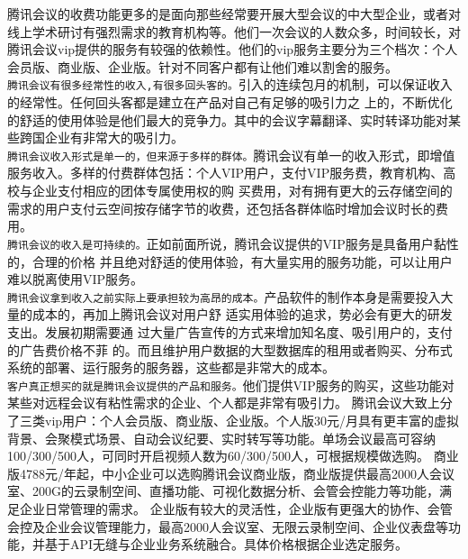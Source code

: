 \documentclass[a4paper,12pt]{article}
\begin{document}
腾讯会议的收费功能更多的是面向那些经常要开展大型会议的中大型企业，或者对
线上学术研讨有强烈需求的教育机构等。他们一次会议的人数众多，时间较长，对腾讯会议vip提供的服务有较强的依赖性。他们的vip服务主要分为三个档次：个人会员版、商业版、企业版。针对不同客户都有让他们难以割舍的服务。\\

\texttt{腾讯会议有很多经常性的收入,有很多回头客的。}引入的连续包月的机制，可以保证收入的经常性。任何回头客都是建立在产品对自己有足够的吸引力之
上的，不断优化的舒适的使用体验是他们最大的竞争力。其中的会议字幕翻译、实时转译功能对某些跨国企业有非常大的吸引力。\\

\texttt{腾讯会议收入形式是单一的，但来源于多样的群体。}腾讯会议有单一的收入形式，即增值服务收入。多样的付费群体包括：个人VIP用户，支付VIP服务费，教育机构、高校与企业支付相应的团体专属使用权的购
买费用，对有拥有更大的云存储空间的需求的用户支付云空间按存储字节的收费，还包括各群体临时增加会议时长的费用。\\

\texttt{腾讯会议的收入是可持续的。}正如前面所说，腾讯会议提供的VIP服务是具备用户黏性的，合理的价格
并且绝对舒适的使用体验，有大量实用的服务功能，可以让用户难以脱离使用VIP服务。\\

\texttt{腾讯会议拿到收入之前实际上要承担较为高昂的成本。}产品软件的制作本身是需要投入大量的成本的，再加上腾讯会议对用户舒
适实用体验的追求，势必会有更大的研发支出。发展初期需要通
过大量广告宣传的方式来增加知名度、吸引用户的，支付的广告费价格不菲
的。而且维护用户数据的大型数据库的租用或者购买、分布式系统的部署、运行服务的服务器，这些都是非常大的成本。\\

\texttt{客户真正想买的就是腾讯会议提供的产品和服务。}他们提供VIP服务的购买，这些功能对某些对远程会议有粘性需求的企业、个人都是非常有吸引力。
腾讯会议大致上分了三类vip用户：个人会员版、商业版、企业版。个人版30元/月具有更丰富的虚拟背景、会聚模式场景、自动会议纪要、实时转写等功能。单场会议最高可容纳100/300/500人，可同时开启视频人数为60/300/500人，可根据规模做选购。
商业版4788元/年起，中小企业可以选购腾讯会议商业版，商业版提供最高2000人会议室、200G的云录制空间、直播功能、可视化数据分析、会管会控能力等功能，满足企业日常管理的需求。
企业版有较大的灵活性，企业版有更强大的协作、会管会控及企业会议管理能力，最高2000人会议室、无限云录制空间、企业仪表盘等功能，并基于API无缝与企业业务系统融合。具体价格根据企业选定服务。\\
\end{document}
